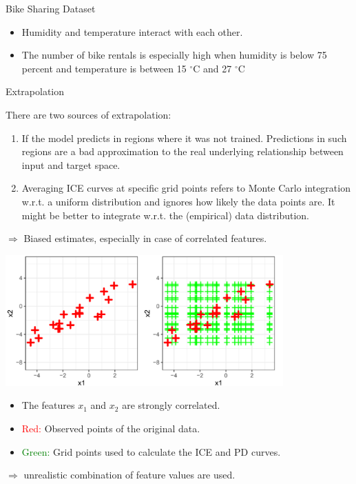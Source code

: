 \begin{vbframe}{Bike Sharing Dataset}
\begin{itemize}
 \item Humidity and temperature interact with each other.
 \item The number of bike rentals is especially high when humidity is below 75 percent and temperature is between 15 $^{\circ}$C and 27 $^{\circ}$C
\end{itemize}
\end{vbframe}

\begin{vbframe}{Extrapolation}

There are two sources of extrapolation:
\lz
\begin{enumerate}
  \item If the model predicts in regions where it was not trained. Predictions in such regions are a bad approximation to the real underlying relationship between input and target space.
  \lz
  \item Averaging ICE curves at specific grid points refers to Monte Carlo integration w.r.t. a   uniform distribution and ignores how likely the data points are.
  It might be better to integrate w.r.t. the (empirical) data distribution.
\end{enumerate}
\lz
$\Rightarrow$ Biased estimates, especially in case of correlated features.

\framebreak

\begin{center}
\includegraphics[width=0.8\textwidth]{figure_man/extrapolation01.png}
\end{center}

\begin{itemize}
\item The features $x_1$ and $x_2$ are strongly correlated.
\item \textcolor{red}{Red:} Observed points of the original data.
\item \textcolor{green}{Green:} Grid points used to calculate the ICE and PD curves.
\end{itemize}
$\Rightarrow$ unrealistic combination of feature values are used.


\end{vbframe}
